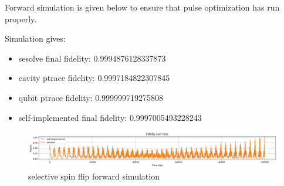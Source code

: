 \documentclass[12pt]{report}
\begin{document}
Forward simulation is given below to ensure that pulse optimization has run properly. 
\par
Simulation gives: 
\begin{itemize}
    \item sesolve final fidelity:  0.9994876128337873
    \item cavity ptrace fidelity:  0.9997184822307845
    \item qubit ptrace fidelity:  0.999999719275808
    \item self-implemented final fidelity:  0.9997005493228243
\end{itemize}
\begin{figure}[H]
    \centering
    \includegraphics[width=0.95\linewidth]{selective_spin_flip_GRAPE_simulation.png}
    \caption{selective spin flip forward simulation}
    \label{fig:selective_spin_flip_forward_simulation}
\end{figure}
\end{document}
